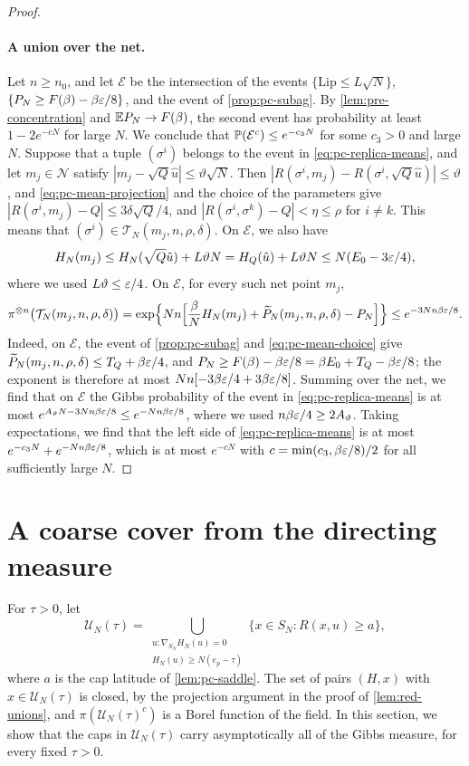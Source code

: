 \begin{proof}
\paragraph{A union over the net.}
Let $n\ge n_0$, and let $\mathcal E$ be the intersection of the events $\{\mathrm{Lip}\le L\sqrt N\}$, $\{P_N\ge F(\beta)-\beta\varepsilon/8\}$, and the event of \cref{prop:pc-subag}. By \cref{lem:pre-concentration} and $\mathbb E P_N\to F(\beta)$, the second event has probability at least $1-2e^{-cN}$ for large $N$. We conclude that $\mathbb P(\mathcal E^c)\le e^{-c_3N}$ for some $c_3>0$ and large $N$. Suppose that a tuple $(\sigma^i)$ belongs to the event in \eqref{eq:pc-replica-means}, and let $m_j\in\mathcal N$ satisfy $|m_j-\sqrt Q\hat u|\le\vartheta\sqrt N$. Then $|R(\sigma^i,m_j)-R(\sigma^i,\sqrt Q\hat u)|\le\vartheta$, and \eqref{eq:pc-mean-projection} and the choice of the parameters give $|R(\sigma^i,m_j)-Q|\le3\delta\sqrt Q/4$, and $|R(\sigma^i,\sigma^k)-Q|<\eta\le\rho$ for $i\ne k$. This means that $(\sigma^i)\in\mathcal T_N(m_j,n,\rho,\delta)$. On $\mathcal E$, we also have
\[
H_N(m_j)\le H_N(\sqrt Q\hat u)+L\vartheta N=H_Q(\hat u)+L\vartheta N\le N(E_0-3\varepsilon/4),
\]
where we used $L\vartheta\le\varepsilon/4$. On $\mathcal E$, for every such net point $m_j$,
\[
\pi^{\otimes n}\bigl(\mathcal T_N(m_j,n,\rho,\delta)\bigr)=\exp\Bigl\{Nn\Bigl[\frac\beta NH_N(m_j)+\widetilde P_N(m_j,n,\rho,\delta)-P_N\Bigr]\Bigr\}\le e^{-3Nn\beta\varepsilon/8}.
\]
Indeed, on $\mathcal E$, the event of \cref{prop:pc-subag} and \eqref{eq:pc-mean-choice} give $\widetilde P_N(m_j,n,\rho,\delta)\le T_Q+\beta\varepsilon/4$, and $P_N\ge F(\beta)-\beta\varepsilon/8=\beta E_0+T_Q-\beta\varepsilon/8$; the exponent is therefore at most $Nn[-3\beta\varepsilon/4+3\beta\varepsilon/8]$. Summing over the net, we find that on $\mathcal E$ the Gibbs probability of the event in \eqref{eq:pc-replica-means} is at most $e^{A_\vartheta N-3Nn\beta\varepsilon/8}\le e^{-Nn\beta\varepsilon/8}$, where we used $n\beta\varepsilon/4\ge2A_\vartheta$. Taking expectations, we find that the left side of \eqref{eq:pc-replica-means} is at most $e^{-c_3N}+e^{-Nn\beta\varepsilon/8}$, which is at most $e^{-cN}$ with $c=\min(c_3,\beta\varepsilon/8)/2$ for all sufficiently large $N$.
\end{proof}

\section{A coarse cover from the directing measure}\label{sec:pc-coarse}

For $\tau>0$, let
\[
\mathcal U_N(\tau)=\bigcup_{\substack{u:\nabla_{S_N}H_N(u)=0\\H_N(u)\ge N(e_p-\tau)}}\bigl\{x\in S_N:R(x,u)\ge a\bigr\},
\]
where $a$ is the cap latitude of \cref{lem:pc-saddle}. The set of pairs $(H,x)$ with $x\in\mathcal U_N(\tau)$ is closed, by the projection argument in the proof of \cref{lem:red-unions}, and $\pi(\mathcal U_N(\tau)^c)$ is a Borel function of the field. In this section, we show that the caps in $\mathcal U_N(\tau)$ carry asymptotically all of the Gibbs measure, for every fixed $\tau>0$.


